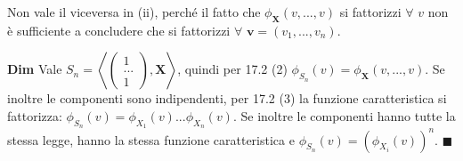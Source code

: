 \documentclass{article}
\begin{document}
Non vale il viceversa in (ii), perch\'{e} il fatto che $\phi _{\mathbf{X}%
}\left( v,...,v\right) $ si fattorizzi $\forall $ $v$ non \`{e} sufficiente
a concludere che si fattorizzi $\forall $ $\mathbf{v}=\left(
v_{1},...,v_{n}\right) $.

\textbf{Dim} Vale $S_{n}=\left\langle \left( 
\begin{array}{c}
1 \\ 
... \\ 
1%
\end{array}%
\right) \mathbf{,X}\right\rangle $, quindi per 17.2 (2) $\phi _{S_{n}}\left(
v\right) =\phi _{\mathbf{X}}\left( v,...,v\right) $. Se inoltre le
componenti sono indipendenti, per 17.2 (3) la funzione caratteristica si
fattorizza: $\phi _{S_{n}}\left( v\right) =\phi _{X_{1}}\left( v\right)
...\phi _{X_{n}}\left( v\right) $. Se inoltre le componenti hanno tutte la
stessa legge, hanno la stessa funzione caratteristica e $\phi _{S_{n}}\left(
v\right) =\left( \phi _{X_{i}}\left( v\right) \right) ^{n}$. $\blacksquare $
\end{document}
